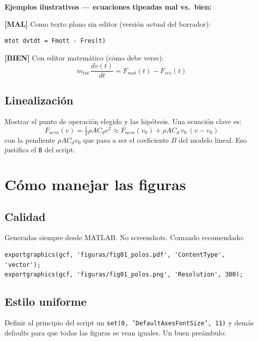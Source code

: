 \documentclass[11pt,a4paper]{article}
\newcommand{\malo}{\textcolor{red!70!black}{\textbf{[MAL]}}}
\newcommand{\bueno}{\textcolor{green!50!black}{\textbf{[BIEN]}}}
\begin{document}
\begin{ejemplo}
\textbf{Ejemplos ilustrativos --- ecuaciones tipeadas mal vs.\ bien:}

\malo{} Como texto plano sin editor (versión actual del borrador):
\begin{lstlisting}[style=plain]
mtot dvtdt = Fmott - Fres(t)
\end{lstlisting}

\bueno{} Con editor matemático (cómo debe verse):
\begin{equation}
m_{tot}\,\frac{dv(t)}{dt} = F_{mot}(t) - F_{res}(t)
\end{equation}
\end{ejemplo}

\subsection{Linealización}

Mostrar el punto de operación elegido y las hipótesis. Una ecuación clave es:
\begin{equation}
F_{aero}(v) = \tfrac{1}{2}\rho A C_d v^2 \approx F_{aero}(v_0) + \rho A C_d\,v_0\,(v - v_0)
\end{equation}
con la pendiente $\rho A C_d v_0$ que pasa a ser el coeficiente $B$ del modelo lineal. Eso justifica el \texttt{B} del script.

\hrulefill

\section{Cómo manejar las figuras}

\subsection{Calidad}

Generadas siempre desde MATLAB. No screenshots. Comando recomendado:

\begin{lstlisting}[style=matlab]
exportgraphics(gcf, 'figuras/fig01_polos.pdf', 'ContentType', 'vector');
exportgraphics(gcf, 'figuras/fig01_polos.png', 'Resolution', 300);
\end{lstlisting}

\subsection{Estilo uniforme}

Definir al principio del script un \texttt{set(0,\,'DefaultAxesFontSize',\,11)} y demás defaults para que todas las figuras se vean iguales. Un buen preámbulo:
\end{document}
